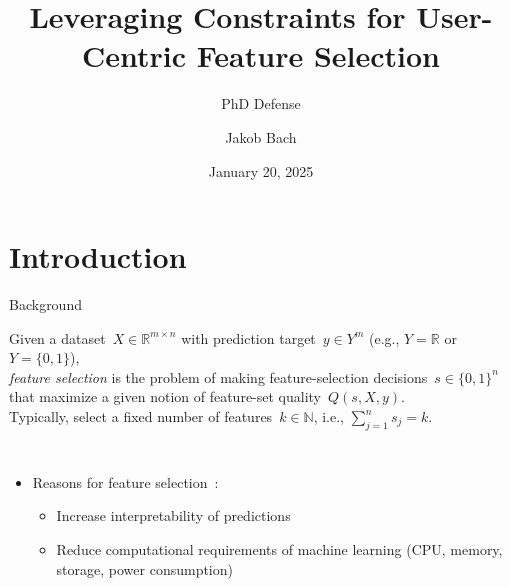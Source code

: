 \documentclass[en, navbarinline, handout]{sdqbeamer}
\title[Leveraging Constraints for User-Centric Feature Selection]{Leveraging Constraints for User-Centric Feature Selection} %
\subtitle{PhD Defense}
\author[Jakob Bach]{Jakob Bach} %
\date[2025-01-20]{January 20, 2025} %
\begin{document}
\KITtitleframe

\section{Introduction}

\begin{frame}[t]{Background}
	\begin{definition}
		\pause
		Given a dataset~$X \in \mathbb{R}^{m \times n}$
		with prediction target~$y \in Y^m$ (e.g., $Y = \mathbb{R}$ or $Y = \{0, 1\}$),\\
		\pause
		\emph{feature selection} is the problem of making feature-selection decisions~$s \in \{0,1\}^n$\\
		\pause
		that maximize a given notion of feature-set quality~$Q(s,X,y)$.\\
		\pause
		Typically, select a fixed number of features~$k \in \mathbb{N}$, i.e., $\sum_{j=1}^n s_j = k$.
	\end{definition}
	\pause
	\vspace{-0.5\baselineskip}
	\begin{columns}
		\begin{itemize}
			\item Reasons for feature selection~\cite{chandrashekar2014survey, li2017feature}:
			\begin{itemize}
				\item Increase interpretability of predictions
				\item Reduce computational requirements of machine learning (CPU, memory, storage, power consumption)

\end{itemize}
\end{itemize}
\end{columns}
\end{frame}
\end{document}
